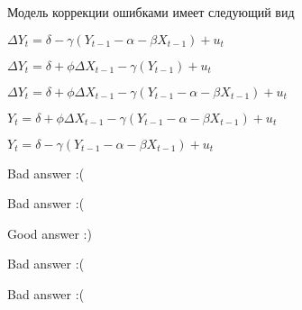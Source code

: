
\begin{question}
Модель коррекции ошибками имеет следующий вид
\begin{answerlist}
  \item \(\Delta Y_t = \delta - \gamma (Y_{t-1} - \alpha - \beta X_{t-1}) + u_t\)
  \item \(\Delta Y_t = \delta + \phi \Delta X_{t-1} - \gamma (Y_{t-1} ) + u_t\)
  \item \(\Delta Y_t = \delta + \phi \Delta X_{t-1} - \gamma (Y_{t-1} - \alpha - \beta X_{t-1}) + u_t\)
  \item \(Y_t = \delta + \phi \Delta X_{t-1} - \gamma (Y_{t-1} - \alpha - \beta X_{t-1}) + u_t\)
  \item \(Y_t = \delta - \gamma (Y_{t-1} - \alpha - \beta X_{t-1}) + u_t\)
\end{answerlist}
\end{question}

\begin{solution}
\begin{answerlist}
  \item Bad answer :(
  \item Bad answer :(
  \item Good answer :)
  \item Bad answer :(
  \item Bad answer :(
\end{answerlist}
\end{solution}


